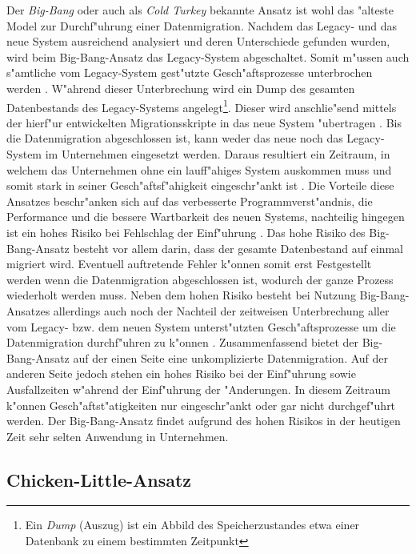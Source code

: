 Der \textit{Big-Bang} oder auch als \textit{Cold Turkey} bekannte Ansatz ist wohl das "alteste Model zur Durchf"uhrung einer Datenmigration. Nachdem das Legacy- und das neue System ausreichend analysiert und deren Unterschiede gefunden wurden, wird beim Big-Bang-Ansatz das Legacy-System abgeschaltet. Somit m"ussen auch s"amtliche vom Legacy-System gest"utzte Gesch"aftsprozesse unterbrochen werden \citep[S.~4]{wuLawless-1997}. 
\lb
W"ahrend dieser Unterbrechung wird ein Dump des gesamten Datenbestands des Legacy-Systems angelegt\footnote{Ein \textit{Dump} (Auszug) ist ein Abbild des Speicherzustandes etwa einer Datenbank zu einem bestimmten Zeitpunkt}. Dieser wird anschlie"send mittels der hierf"ur entwickelten Migrationsskripte in das neue System "ubertragen \citep[S.~3]{brodie-1993}. Bis die Datenmigration abgeschlossen ist, kann weder das neue noch das Legacy-System im Unternehmen eingesetzt werden. Daraus resultiert ein Zeitraum, in welchem das Unternehmen ohne ein lauff"ahiges System auskommen muss und somit stark in seiner Gesch"aftsf"ahigkeit eingeschr"ankt ist \citep[S.~3f.]{brodie-1993}.
\lb
Die Vorteile diese Ansatzes beschr"anken sich auf das verbesserte Programmverst"andnis, die Performance und die bessere Wartbarkeit des neuen Systems, nachteilig hingegen ist ein hohes Risiko bei Fehlschlag der Einf"uhrung \citep[S.~105]{bisbal-1999}. Das hohe Risiko des Big-Bang-Ansatz besteht vor allem darin, dass der gesamte Datenbestand auf einmal migriert wird. Eventuell auftretende Fehler k"onnen somit erst Festgestellt werden wenn die Datenmigration abgeschlossen ist, wodurch der ganze Prozess wiederholt werden muss. Neben dem hohen Risiko besteht bei Nutzung Big-Bang-Ansatzes allerdings auch noch der Nachteil der zeitweisen Unterbrechung aller vom Legacy- bzw. dem neuen System unterst"utzten Gesch"aftsprozesse um die Datenmigration durchf"uhren zu k"onnen \citep[S.~4]{wuLawless-1997}.
\lb
Zusammenfassend bietet der Big-Bang-Ansatz auf der einen Seite eine unkomplizierte Datenmigration. Auf der anderen Seite jedoch stehen ein hohes Risiko bei der Einf"uhrung sowie Ausfallzeiten w"ahrend der Einf"uhrung der "Anderungen. In diesem Zeitraum k"onnen Gesch"aftst"atigkeiten nur eingeschr"ankt oder gar nicht durchgef"uhrt werden. Der Big-Bang-Ansatz findet aufgrund des hohen Risikos in der heutigen Zeit sehr selten Anwendung in Unternehmen.

\subsection{Chicken-Little-Ansatz}

